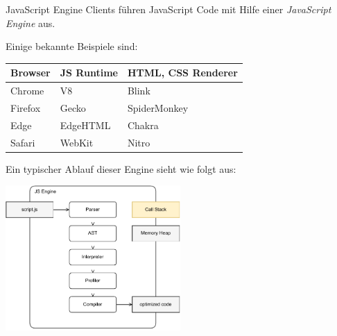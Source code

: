 \begin{defi}{JavaScript Engine}
    Clients führen JavaScript Code mit Hilfe einer \emph{JavaScript Engine} aus.

    Einige bekannte Beispiele sind:

    \begin{center}
        \begin{tabular}{|l|l|l|}
            \hline
            Browser & JS Runtime & HTML, CSS Renderer \\\hline\hline
            Chrome  & V8         & Blink              \\\hline
            Firefox & Gecko      & SpiderMonkey       \\\hline
            Edge    & EdgeHTML   & Chakra             \\\hline
            Safari  & WebKit     & Nitro              \\\hline
        \end{tabular}
    \end{center}

    Ein typischer Ablauf dieser Engine sieht wie folgt aus:

    \begin{center}
        \includegraphics[width=0.5\textwidth]{includes/figures/defi_js_engine.pdf}
    \end{center}
\end{defi}


